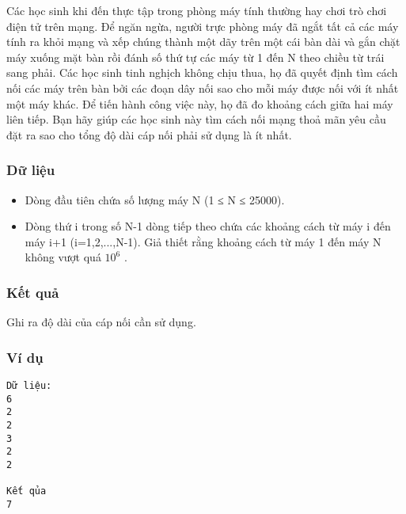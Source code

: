 



   Các học sinh khi đến thực tập trong phòng máy tính thường hay chơi trò chơi điện tử trên mạng. Để ngăn ngừa, người trực phòng máy đã ngắt tất cả các máy tính ra khỏi mạng và xếp chúng thành một dãy trên một cái bàn dài và gắn chặt máy xuống mặt bàn rồi đánh số thứ tự các máy từ 1 đến N theo chiều từ trái sang phải. Các học sinh tinh nghịch không chịu thua, họ đã quyết định tìm cách nối các máy trên bàn bởi các đoạn dây nối sao cho mỗi máy được nối với ít nhất một máy khác. Để tiến hành công việc này, họ đã đo khoảng cách giữa hai máy liên tiếp. Bạn hãy giúp các học sinh này tìm cách nối mạng thoả mãn yêu cầu đặt ra sao cho tổng độ dài cáp nối phải sử dụng là ít nhất.  

\subsubsection{   Dữ liệu  }
\begin{itemize}
	\item     Dòng đầu tiên chứa số lượng máy N (1 ≤ N ≤ 25000).   
	\item     Dòng thứ i trong số N-1 dòng tiếp theo chứa các khoảng cách từ máy i đến máy i+1 (i=1,2,...,N-1). Giả thiết rằng khoảng cách từ máy 1 đến máy N không vượt quá $10^{6}$    .   
\end{itemize}

\subsubsection{   Kết quả  }

   Ghi ra độ dài của cáp nối cần sử dụng.  

\subsubsection{   Ví dụ  }
\begin{verbatim}
Dữ liệu:
6
2
2
3
2
2

Kết qủa
7
\end{verbatim}
